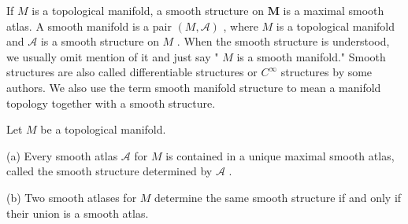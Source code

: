 \begin{definition}
\label{def:1-2-extra-5}
\leanok
If $M$ is a topological manifold, a smooth structure on $\mathbf{M}$ is a maximal smooth atlas. A smooth manifold is a pair $\left( {M,\mathcal{A}}\right)$ , where $M$ is a topological manifold and $\mathcal{A}$ is a smooth structure on $M$ . When the smooth structure is understood, we usually omit mention of it and just say " $M$ is a smooth manifold." Smooth structures are also called differentiable structures or ${C}^{\infty }$ structures by some authors. We also use the term smooth manifold structure to mean a manifold topology together with a smooth structure.
\end{definition}

\begin{proposition}
\label{prop:1-17}
\leanok
{}
Let $M$ be a topological manifold.

(a) Every smooth atlas $\mathcal{A}$ for $M$ is contained in a unique maximal smooth atlas, called the smooth structure determined by $\mathcal{A}$ .

(b) Two smooth atlases for $M$ determine the same smooth structure if and only if their union is a smooth atlas.
\end{proposition}

